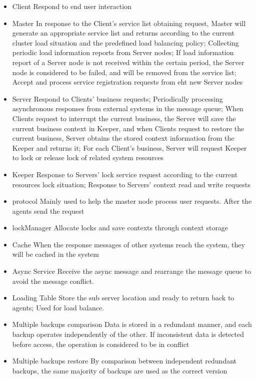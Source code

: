\documentclass{article}
\begin{document}
	\begin{itemize}
		\item{Client} Respond to end user interaction
		\item{Master} In response to the Client's service list obtaining request, Master will generate an appropriate service list and returns according to the current cluster load situation and the predefined load balancing policy; Collecting periodic load information reports from Server nodes; If load information report of a Server node is not received within the certain period, the Server node is considered to be failed, and will be removed from the service list; Accept and process service registration requests from eht new Server nodes			
		\item{Server} Respond to Clients' business requests; Periodically processing asynchronous responses from external systems  in the message queue; When Clients request to interrupt the current business, the Server will save the current business context in Keeper, and when Clients request to restore the current business, Server obtains the stored context information from the Keeper and returns it; For each Client's business, Server will request Keeper to lock or release lock of related system resources 			
		\item{Keeper} Response to Servers' lock service request according to the current resources lock situation; Response to Servers' context read and write requests			
		\item{protocol} Mainly used to help the master node process user requests. After the agents send the request
		\item{lockManager} Allocate locks and save contexts through context storage
		\item{Cache} When the response messages of other systems reach the system, they will be cached in the system
		\item{Async Service} Receive the async message and rearrange the message queue to avoid the message conflict.
		\item{Loading Table} Store the sub server location and ready to return back to agents; Used for load balance.
		\item{Multiple backups comparison} Data is stored in a redundant manner, and each backup operates independently of the other. If inconsistent data is detected before access, the operation is considered to be in conflict
		\item{Multiple backups restore} By comparison between independent redundant backups, the same majority of backups are used as the correct version

	\end{itemize}
\end{document}
